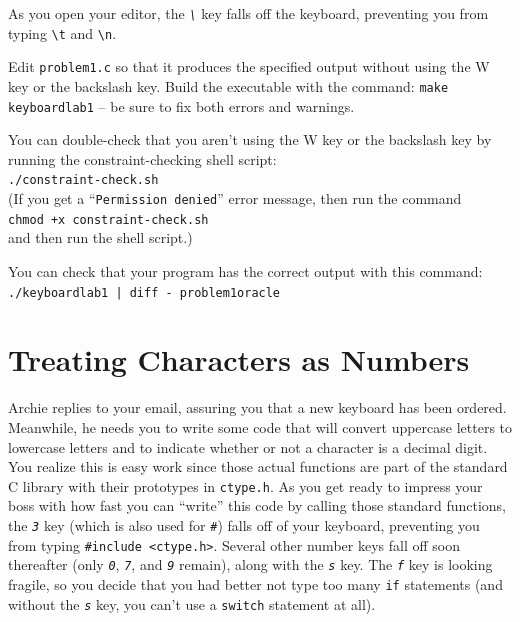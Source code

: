 As you open your editor, the \textit{\texttt{\textbackslash}} key falls off the
keyboard, preventing you from typing \texttt{\textbackslash t} and
\texttt{\textbackslash n}.

Edit \texttt{problem1.c} so that it produces the specified output without using
the W key or the backslash key. Build the executable with the command:
\texttt{make keyboardlab1} -- be sure to fix both errors and warnings.

You can double-check that you aren't using the W key or the backslash key by
running the constraint-checking shell script: \\
\texttt{./constraint-check.sh} \\
(If you get a ``\texttt{Permission denied}'' error message, then run the
command \\
\texttt{chmod +x constraint-check.sh} \\
and then run the shell script.)

You can check that your program has the correct output with this command: \\
\texttt{./keyboardlab1 | diff - problem1oracle}


\section{Treating Characters as Numbers}

Archie replies to your email, assuring you that a new keyboard has been
ordered. Meanwhile, he needs you to write some code that will convert uppercase
letters to lowercase letters and to indicate whether or not a character is a
decimal digit. You realize this is easy work since those actual functions are
part of the standard C library with their prototypes in \texttt{ctype.h}. As
you get ready to impress your boss with how fast you can ``write'' this code by
calling those standard functions, the \textit{\texttt{3}} key (which is also
used for \textit{\texttt{\#}}) falls off of your keyboard, preventing you from
typing \lstinline{#include <ctype.h>}. Several other number keys fall off soon
thereafter (only \textit{\texttt{0}}, \textit{\texttt{7}}, and
\textit{\texttt{9}} remain), along with the \textit{\texttt{s}} key. The
\textit{\texttt{f}} key is looking fragile, so you decide that you had better
not type too many \lstinline{if} statements (and without the
\textit{\texttt{s}} key, you can't use a \lstinline{switch} statement at all).

